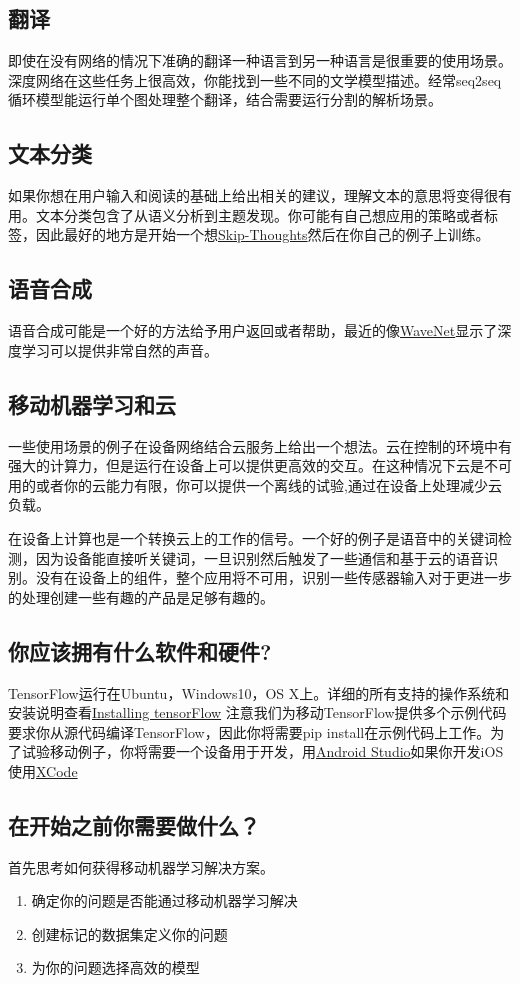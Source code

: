 \subsection{翻译}
即使在没有网络的情况下准确的翻译一种语言到另一种语言是很重要的使用场景。深度网络在这些任务上很高效，你能找到一些不同的文学模型描述。经常seq2seq循环模型能运行单个图处理整个翻译，结合需要运行分割的解析场景。
\subsection{文本分类}
如果你想在用户输入和阅读的基础上给出相关的建议，理解文本的意思将变得很有用。文本分类包含了从语义分析到主题发现。你可能有自己想应用的策略或者标签，因此最好的地方是开始一个想\href{https://github.com/tensorflow/models/tree/master/skip_thoughts/}{Skip-Thoughts}然后在你自己的例子上训练。
\subsection{语音合成}
语音合成可能是一个好的方法给予用户返回或者帮助，最近的像\href{https://deepmind.com/blog/wavenet-generative-model-raw-audio/}{WaveNet}显示了深度学习可以提供非常自然的声音。
\subsection{移动机器学习和云}
一些使用场景的例子在设备网络结合云服务上给出一个想法。云在控制的环境中有强大的计算力，但是运行在设备上可以提供更高效的交互。在这种情况下云是不可用的或者你的云能力有限，你可以提供一个离线的试验,通过在设备上处理减少云负载。

在设备上计算也是一个转换云上的工作的信号。一个好的例子是语音中的关键词检测，因为设备能直接听关键词，一旦识别然后触发了一些通信和基于云的语音识别。没有在设备上的组件，整个应用将不可用，识别一些传感器输入对于更进一步的处理创建一些有趣的产品是足够有趣的。
\subsection{你应该拥有什么软件和硬件?}
TensorFlow运行在Ubuntu，Windows10，OS X上。详细的所有支持的操作系统和安装说明查看\href{https://www.tensorflow.org/install/index?hl=zh-cn}{Installing tensorFlow}
注意我们为移动TensorFlow提供多个示例代码要求你从源代码编译TensorFlow，因此你将需要pip install在示例代码上工作。为了试验移动例子，你将需要一个设备用于开发，用\href{https://developer.android.com/studio/install.html?hl=zh-cn}{Android Studio}如果你开发iOS使用\href{https://developer.apple.com/xcode/}{XCode}
\subsection{在开始之前你需要做什么？}
首先思考如何获得移动机器学习解决方案。
\begin{enumerate}
    \item 确定你的问题是否能通过移动机器学习解决
    \item 创建标记的数据集定义你的问题
    \item 为你的问题选择高效的模型
\end{enumerate}
